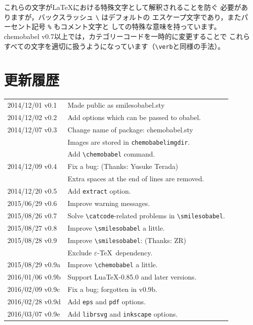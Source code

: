 \documentclass[12pt]{ltjsarticle}
\def\Lpack#1{\textsf{#1}}
\def\Lcode#1{\texttt{#1}}
\begin{document}
これらの文字が\LaTeX における特殊文字として解釈されることを防ぐ
必要がありますが，バックスラッシュ \verb|\| はデフォルトの
エスケープ文字であり，またパーセント記号 \verb|%| もコメント文字と
しての特殊な意味を持っています。
\Lpack{chemobabel} v0.7以上では，カテゴリーコードを一時的に変更することで
これらすべての文字を適切に扱うようになっています（\verb+\verb+と同様の手法）。

\clearpage

\section{更新履歴}

\begin{table}[h]
\centering
\begin{tabular}{ll}
2014/12/01 v0.1  & Made public as \Lpack{smilesobabel.sty} \\
2014/12/02 v0.2  & Add options which can be passed to obabel. \\
2014/12/07 v0.3  & Change name of package: \Lpack{chemobabel.sty} \\
                 & Images are stored in \Lcode{chemobabelimgdir}. \\
                 & Add \verb|\chemobabel| command. \\
2014/12/09 v0.4  & Fix a bug: (Thanks: Yusuke Terada) \\
                 & Extra spaces at the end of lines are removed. \\
2014/12/20 v0.5  & Add \verb|extract| option. \\
2015/06/29 v0.6  & Improve warning messages. \\
2015/08/26 v0.7  & Solve \verb|\catcode|-related problems in \verb|\smilesobabel|. \\
2015/08/27 v0.8  & Improve \verb|\smilesobabel| a little. \\
2015/08/28 v0.9  & Improve \verb|\smilesobabel|: (Thanks: ZR) \\
                 & Exclude $\varepsilon$-\TeX\ dependency. \\
2015/08/29 v0.9a & Improve \verb|\chemobabel| a little. \\
2016/01/06 v0.9b & Support Lua\TeX-0.85.0 and later versions. \\
2016/02/09 v0.9c & Fix a bug; forgotten in v0.9b. \\
2016/02/28 v0.9d & Add \verb|eps| and \verb|pdf| options. \\
2016/03/07 v0.9e & Add \verb|librsvg| and \verb|inkscape| options. \\

\end{tabular}
\end{table}
\end{document}
